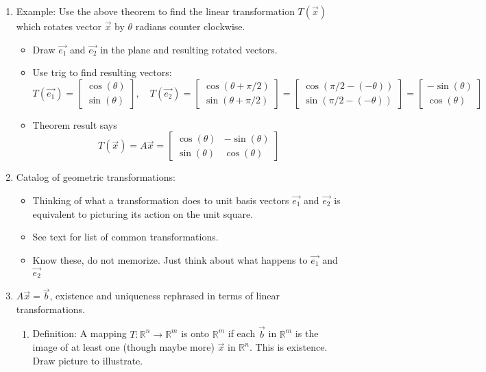 \documentclass{article}
\begin{document}
\begin{enumerate}
\item Example: Use the above theorem to find the linear transformation $T(\vec{x})$ which rotates vector $\vec{x}$ by $\theta$ radians counter clockwise.
\begin{itemize}
\item Draw $\vec{e_1}$ and $\vec{e_2}$ in the plane and resulting rotated vectors.
\item Use trig to find resulting vectors:
\[
T(\vec{e_1}) = \left[ \begin{array}{c}
\cos(\theta) \\
\sin(\theta)
\end{array} \right]
, \quad 
T(\vec{e_2}) = \left[ \begin{array}{c}
\cos(\theta+\pi/2) \\
\sin(\theta+\pi/2)
\end{array} \right]
= \left[ \begin{array}{c}
\cos(\pi/2-(-\theta)) \\
\sin(\pi/2-(-\theta))
\end{array} \right]
= \left[ \begin{array}{c}
-\sin(\theta) \\
\cos(\theta)
\end{array} \right]
\]
\item Theorem result says
\[
T(\vec{x}) = A\vec{x} = 
\left[
\begin{array}{cc}
\cos(\theta) & -\sin(\theta) \\
\sin(\theta) & \cos(\theta)
\end{array}
\right]
\]
\end{itemize}

\item Catalog of geometric transformations:
\begin{itemize}
\item Thinking of what a transformation does to unit basis vectors $\vec{e_1}$ and $\vec{e_2}$ is equivalent to picturing its action on the unit square. 
\item See text for list of common transformations.
\item Know these, do not memorize. Just think about what happens to $\vec{e_1}$ and $\vec{e_2}$
\end{itemize}


\item $A\vec{x} = \vec{b}$, existence and uniqueness rephrased in terms of linear transformations.
\begin{enumerate}
\item Definition: A mapping $T:\mathbb{R}^n \rightarrow \mathbb{R}^m$ is onto $\mathbb{R}^m$ if each $\vec{b}$ in $\mathbb{R}^m$ is the image of at least one (though maybe more) $\vec{x}$ in $\mathbb{R}^n$. This is existence. Draw picture to illustrate.


\end{enumerate}
\end{enumerate}
\end{document}
